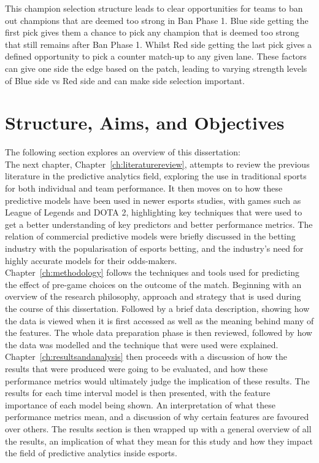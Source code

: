 This champion selection structure leads to clear opportunities for teams to ban out champions that are deemed too strong in Ban Phase 1.
Blue side getting the first pick gives them a chance to pick any champion that is deemed too strong that still remains after Ban Phase 1.
Whilst Red side getting the last pick gives a defined opportunity to pick a counter match-up to any given lane.
These factors can give one side the edge based on the \Gls{patch}, leading to varying strength levels of Blue side vs Red side and can make side selection important.

\section{Structure, Aims, and Objectives}\label{sec:Structure, Aims, and Objectives}

The following section explores an overview of this dissertation: \\

The next chapter, Chapter~\ref{ch:literaturereview}, attempts to review the previous literature in the predictive analytics field, exploring the use in traditional sports for both individual and team performance.
It then moves on to how these predictive models have been used in newer esports studies, with games such as League of Legends and DOTA 2, highlighting key techniques that were used to get a better understanding of key predictors and better performance metrics.
The relation of commercial predictive models were briefly discussed in the betting industry with the popularisation of esports betting, and the industry's need for highly accurate models for their odds-makers. \\

Chapter~\ref{ch:methodology} follows the techniques and tools used for predicting the effect of pre-game choices on the outcome of the match.
Beginning with an overview of the research philosophy, approach and strategy that is used during the course of this dissertation.
Followed by a brief data description, showing how the data is viewed when it is first accessed as well as the meaning behind many of the features.
The whole data preparation phase is then reviewed, followed by how the data was modelled and the technique that were used were explained. \\

Chapter~\ref{ch:resultsandanalysis} then proceeds with a discussion of how the results that were produced were going to be evaluated, and how these performance metrics would ultimately judge the implication of these results.
The results for each time interval model is then presented, with the feature importance of each model being shown.
An interpretation of what these performance metrics mean, and a discussion of why certain features are favoured over others.
The results section is then wrapped up with a general overview of all the results, an implication of what they mean for this study and how they impact the field of predictive analytics inside esports. \\


